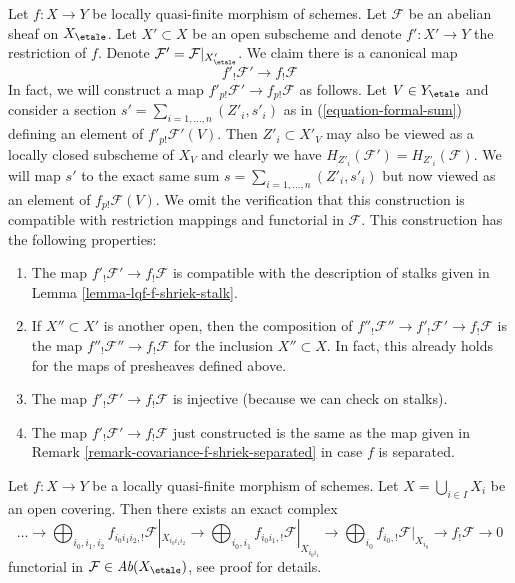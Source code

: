 \begin{remark}
\label{remark-covariance-lqf-f-shriek}
Let $f : X \to Y$ be locally quasi-finite morphism of schemes. Let
$\mathcal{F}$ be an abelian sheaf on $X_\etale$.
Let $X' \subset X$ be an open subscheme and denote $f' : X' \to Y$
the restriction of $f$. Denote $\mathcal{F}' = \mathcal{F}|_{X'_\etale}$.
We claim there is a canonical map
$$
f'_!\mathcal{F}' \longrightarrow f_!\mathcal{F}
$$
In fact, we will construct a map $f'_{p!}\mathcal{F}' \to f_{p!}\mathcal{F}$
as follows. Let $V \in Y_\etale$ and consider a section
$s' = \sum_{i = 1, \ldots, n} (Z'_i, s'_i)$ as in
(\ref{equation-formal-sum}) defining an element of $f'_{p!}\mathcal{F}'(V)$.
Then $Z'_i \subset X'_V$ may also be viewed as a locally closed subscheme
of $X_V$ and clearly we have $H_{Z'_i}(\mathcal{F}') = H_{Z'_i}(\mathcal{F})$.
We will map $s'$ to the exact same sum
$s = \sum_{i = 1, \ldots, n} (Z'_i, s'_i)$
but now viewed as an element of $f_{p!}\mathcal{F}(V)$.
We omit the verification that this construction is compatible with
restriction mappings and functorial in $\mathcal{F}$.
This construction has the following properties:
\begin{enumerate}
\item The map $f'_!\mathcal{F}' \to f_!\mathcal{F}$ is compatible with
the description of stalks given in Lemma \ref{lemma-lqf-f-shriek-stalk}.
\item If $X'' \subset X'$ is another open, then the composition of
$f''_!\mathcal{F}'' \to f'_!\mathcal{F}' \to f_!\mathcal{F}$
is the map $f''_!\mathcal{F}'' \to f_!\mathcal{F}$ for the
inclusion $X'' \subset X$. In fact, this already holds for the
maps of presheaves defined above.
\item The map $f'_!\mathcal{F}' \to f_!\mathcal{F}$ is injective
(because we can check on stalks).
\item The map $f'_!\mathcal{F}' \to f_!\mathcal{F}$ just constructed
is the same as the map given in
Remark \ref{remark-covariance-f-shriek-separated}
in case $f$ is separated.
\end{enumerate}
\end{remark}

\begin{lemma}
\label{lemma-lqf-colimit-f-shriek}
Let $f : X \to Y$ be a locally quasi-finite morphism of schemes.
Let $X = \bigcup_{i \in I} X_i$ be an open covering. Then there
exists an exact complex
$$
\ldots \to
\bigoplus\nolimits_{i_0, i_1, i_2} f_{i_0i_1i_2, !}
\mathcal{F}|_{X_{i_0i_1i_2}} \to
\bigoplus\nolimits_{i_0, i_1} f_{i_0i_1, !} \mathcal{F}|_{X_{i_0i_1}} \to
\bigoplus\nolimits_{i_0} f_{i_0, !} \mathcal{F}|_{X_{i_0}}
\to f_!\mathcal{F} \to 0
$$
functorial in $\mathcal{F} \in \textit{Ab}(X_\etale)$, see
proof for details.
\end{lemma}

